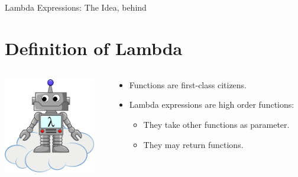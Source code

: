 \documentclass{beamer}
\begin{document}
	\begin{frame}{Lambda Expressions: The Idea, behind}
		\section{Definition of Lambda}
		\begin{columns}
    			\begin{column}{0.3\textwidth}
					\centering
					\includegraphics[width=4cm]{cloudlambdabot}	
    			\end{column}
    			\begin{column}{0.7\textwidth}
					
					\begin{itemize}
						\item Functions are first-class citizens.
						\item Lambda expressions are high order functions:
						\begin{itemize}
						\item They take other functions as parameter.	
						\item They may return functions.					
						\end{itemize}
					\end{itemize}
    			\end{column}
		\end{columns}
	\end{frame}	
	
\end{document}
